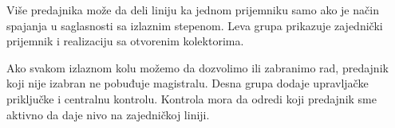 Više predajnika može da deli liniju ka jednom prijemniku samo ako je način spajanja u saglasnosti sa izlaznim stepenom. Leva grupa prikazuje zajednički prijemnik i realizaciju sa otvorenim kolektorima.

Ako svakom izlaznom kolu možemo da dozvolimo ili zabranimo rad, predajnik koji nije izabran ne pobuđuje magistralu. Desna grupa dodaje upravljačke priključke i centralnu kontrolu. Kontrola mora da odredi koji predajnik sme aktivno da daje nivo na zajedničkoj liniji.
